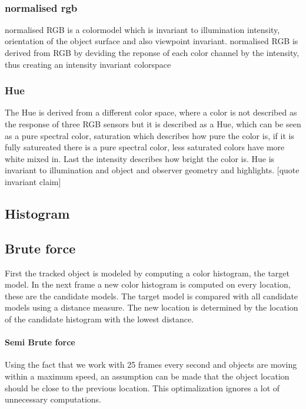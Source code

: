 \documentclass[a4paper,11pt]{article}
\begin{document}
		\

		\subsubsection{normalised rgb}
		normalised RGB is a colormodel which is invariant to illumination intensity, orientation of the object surface and also viewpoint invariant. 
		normalised RGB is derived from RGB by deviding the reponse of each color channel by the intensity, thus creating an intensity invariant colorspace
		\subsubsection{Hue}
		The Hue is derived from a different color space, where a color is not described as the response of three RGB sensors but it is described as a Hue, which can be seen as a pure spectral color, saturation which describes how pure the color is, if it is fully satureated there is a pure spectral color, less saturated colors have more white mixed in. Last the intensity describes how bright the color is. 
		Hue is invariant to illumination and object and observer geometry and highlights. [quote invariant claim]
	\subsection{Histogram}



	\subsection{Brute force}
		First the tracked object is modeled by computing a color histogram, the
		target model.
		In the next frame a new color histogram is computed on every location,
		these are the candidate models.
		The target model is compared with all candidate models using a distance
		measure. The new location is determined by the location of the candidate
		histogram with the lowest distance.
		
		\paragraph{Semi Brute force}
		Using the fact that we work with 25 frames every second and objects are moving
		within a maximum speed, an assumption can be made that the object
		location should be close to the previous location. This optimalization
		ignores a lot of unnecessary computations.
\end{document}
